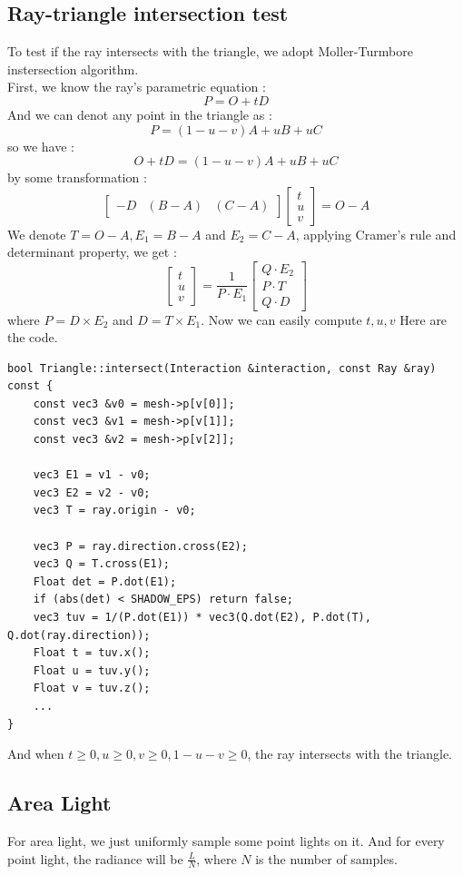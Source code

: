 \documentclass[acmtog]{acmart}
\begin{document}
\subsection{Ray-triangle intersection test}
To test if the ray intersects with the triangle, we adopt Moller-Turmbore instersection algorithm.\\
First, we know the ray's parametric equation :
$$P = O + tD$$
And we can denot any point in the triangle as :
$$P = (1- u - v)A + uB + uC$$
so we have :
$$O + tD = (1- u - v)A + uB + uC$$
by some transformation :
$$\left[\begin{matrix}
	-D & (B-A) & (C-A)
\end{matrix}\right]\left[\begin{matrix}
	t \\ u \\ v
\end{matrix}\right] = O - A$$
We denote $T = O - A, E_1 = B - A$ and $E_2 = C - A$, applying Cramer's rule and determinant property, we get :
$$\left[\begin{matrix}
	t \\ u \\ v
\end{matrix}\right] = \frac{1}{P \cdot E_1}\left[\begin{matrix}
	Q \cdot E_2 \\ P \cdot T \\ Q	\cdot D
\end{matrix}\right]$$
where $P = D \times E_2$ and $D = T \times E_1$. Now we can easily compute $t,u,v$
Here are the code.
\begin{lstlisting}
bool Triangle::intersect(Interaction &interaction, const Ray &ray) const {
	const vec3 &v0 = mesh->p[v[0]];
	const vec3 &v1 = mesh->p[v[1]];
	const vec3 &v2 = mesh->p[v[2]];
	
	vec3 E1 = v1 - v0;
	vec3 E2 = v2 - v0;
	vec3 T = ray.origin - v0;

	vec3 P = ray.direction.cross(E2);
	vec3 Q = T.cross(E1);
	Float det = P.dot(E1);
	if (abs(det) < SHADOW_EPS) return false;
	vec3 tuv = 1/(P.dot(E1)) * vec3(Q.dot(E2), P.dot(T), Q.dot(ray.direction));
	Float t = tuv.x();
	Float u = tuv.y();
	Float v = tuv.z();
	...
}
\end{lstlisting}
And when $t \geq 0, u \geq 0, v \geq 0, 1 - u -v \geq 0$, the ray intersects with the triangle.
\subsection{Area Light}
For area light, we just uniformly sample some point lights on it. And for every point light, the radiance
will be $\frac{L}{N}$, where $N$ is the number of samples.
\end{document}
